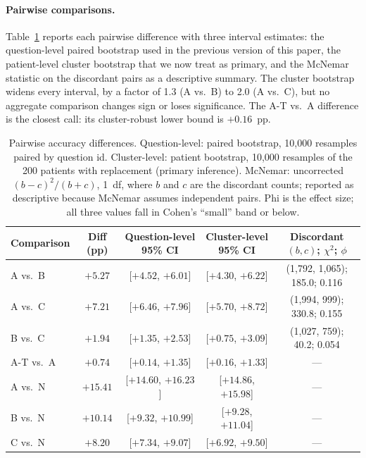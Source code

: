 \paragraph{Pairwise comparisons.}
Table~\ref{tab:pairwise} reports each pairwise difference with three interval estimates:
the question-level paired bootstrap used in the previous version of this paper, the
patient-level cluster bootstrap that we now treat as primary, and the McNemar statistic
on the discordant pairs as a descriptive summary.  The cluster bootstrap widens every
interval, by a factor of 1.3 (A vs.\ B) to 2.0 (A vs.\ C), but no aggregate comparison
changes sign or loses significance.  The A-T vs.\ A difference is the closest call: its
cluster-robust lower bound is $+0.16$~pp.

\begin{table}[htbp]
\centering
\small
\caption{Pairwise accuracy differences.  Question-level: paired bootstrap, 10,000
resamples paired by question id.  Cluster-level: patient bootstrap, 10,000 resamples of
the 200 patients with replacement (primary inference).  McNemar: uncorrected
$(b-c)^2/(b+c)$, 1~df, where $b$ and $c$ are the discordant counts; reported as
descriptive because McNemar assumes independent pairs.  Phi is the effect size; all
three values fall in Cohen's ``small'' band or below.}
\label{tab:pairwise}
\begin{tabular}{lcccc}
\toprule
Comparison & Diff (pp) & Question-level 95\% CI & Cluster-level 95\% CI & Discordant $(b, c)$; $\chi^2$; $\phi$ \\
\midrule
A vs.\ B   & $+5.27$ & [$+4.52$, $+6.01$] & [$+4.30$, $+6.22$] & (1{,}792, 1{,}065); 185.0; 0.116 \\
A vs.\ C   & $+7.21$ & [$+6.46$, $+7.96$] & [$+5.70$, $+8.72$] & (1{,}994, 999); 330.8; 0.155 \\
B vs.\ C   & $+1.94$ & [$+1.35$, $+2.53$] & [$+0.75$, $+3.09$] & (1{,}027, 759); 40.2; 0.054 \\
A-T vs.\ A & $+0.74$ & [$+0.14$, $+1.35$] & [$+0.16$, $+1.33$] & --- \\
A vs.\ N   & $+15.41$ & [$+14.60$, $+16.23$] & [$+14.86$, $+15.98$] & --- \\
B vs.\ N   & $+10.14$ & [$+9.32$, $+10.99$] & [$+9.28$, $+11.04$] & --- \\
C vs.\ N   & $+8.20$ & [$+7.34$, $+9.07$] & [$+6.92$, $+9.50$] & --- \\
\bottomrule
\end{tabular}
\end{table}

